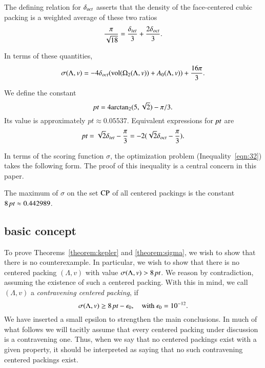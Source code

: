 \begin{remark}
The defining relation for $\delta_{oct}$ asserts that the density of the
face-centered cubic packing is a weighted average of these two
ratios
    $$\frac{\pi}{\sqrt{18}} = \frac{\delta_{tet}}{3} + \frac{2 \delta_{oct}}{3}.$$
\end{remark}

In terms of these quantities,
\begin{equation}
    \sigma(\Lambda,v) = -4 \delta_{oct} ({\operatorname{vol}}(\Omega_2(\Lambda,v)) + A_0(\Lambda,v)) +
    \frac{16\pi}{3}.
\end{equation}

\begin{definition}[point,~$\pt$]\label{def:pt}
We define the constant
   $$\hbox{\it pt} = 4{\operatorname{arctan_2}}(5,\sqrt2) - \pi/3.$$
Its value is approximately $pt \approx 0.05537.$  Equivalent
expressions for $\pt$ are
    $$
    \hbox{\it pt} = \sqrt2 \delta_{tet} - \frac{\pi}{3} = -2 (\sqrt2 \delta_{oct} -
    \frac{\pi}{3}).
    $$
\end{definition}

In terms of the scoring function $\sigma$, the optimization
problem (Inequality~\ref{eqn:32}) takes the following form. The
proof of this inequality is a central concern in this paper.

\begin{theorem}\label{theorem:sigma}
The maximum of $\sigma$ on the set ${\operatorname{CP}}$ of all centered
packings is the constant $8\,\hbox{\it pt}\approx 0.442989$.
\end{theorem}



\subsection{basic concept}
\label{sec:outline}

To prove Theorems~\ref{theorem:kepler} and \ref{theorem:sigma}, we
wish to show that there is no counterexample.  In particular, we
wish to show that there is no centered packing $(\Lambda,v)$ with value
$\sigma(\Lambda,v)
> 8\,\hbox{\it pt}$.  We reason by contradiction, assuming the existence of
such a centered packing.  With this in mind, we call $(\Lambda,v)$ a {\it
contravening centered packing}, if
    $$\sigma(\Lambda,v)\ge 8\,\hbox{\it pt} - \epsilon_0, \quad \text{with }\epsilon_0 = 10^{-12}.$$
We have inserted a small epsilon to strengthen the main
conclusions.  In much of what follows we will tacitly assume that
every centered packing under discussion is a contravening one.
Thus, when we say that no centered packings exist with a given
property, it should be interpreted as saying that no such
contravening centered packings exist.

